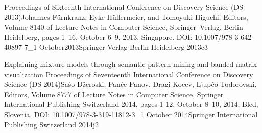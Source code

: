 \documentclass[dissertation]{aaltoseries}
\begin{document}


{Proceedings of Sixteenth International Conference on Discovery Science (DS 2013)}{Johannes F\"{u}rnkranz, 
Eyke H\"{u}llermeier, and Tomoyuki Higuchi, Editors, Volume 8140 of Lecture Notes in Computer Science, 
Springer--Verlag, Berlin Heidelberg, pages 1--16,  October 6--9, 2013, Singapore. DOI: 10.1007/978-3-642-40897-7\_1 }
{October}{2013}{Springer-Verlag Berlin Heidelberg 2013}{c3}



{Explaining mixture models through semantic pattern mining and banded matrix visualization}
{Proceedings of Seventeenth International Conference on Discovery Science (DS 2014)}{Sa\v{s}o D\v{z}eroski, Pan\v{c}e Panov, Dragi Kocev, 
Ljup\v{c}o Todorovski, Editors, Volume 8777 of Lecture Notes in Computer Science, Springer International Publishing Switzerland 2014, pages 1-12,
October 8--10, 2014, Bled, Slovenia. DOI: 10.1007/978-3-319-11812-3\_1}
{October} {2014}{Springer International Publishing Switzerland 2014}{j2}
\end{document}
